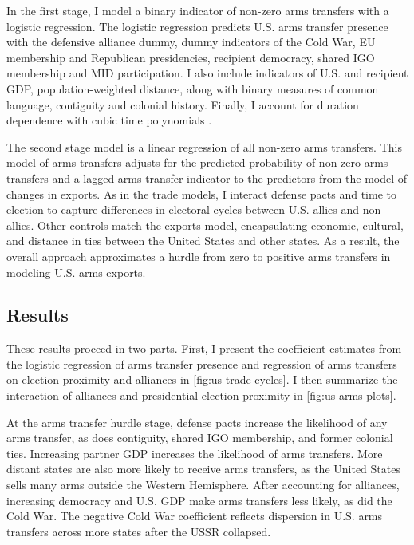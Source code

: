 \documentclass[12pt]{article}
\begin{document}
In the first stage, I model a binary indicator of non-zero arms transfers with a logistic regression. 
The logistic regression predicts U.S. arms transfer presence with the defensive alliance dummy, dummy indicators of the Cold War, EU membership and Republican presidencies, recipient democracy, shared IGO membership and MID participation. 
I also include indicators of U.S. and recipient GDP, population-weighted distance, along with binary measures of common language, contiguity and colonial history. 
Finally, I account for duration dependence with cubic time polynomials \citep{CarterSignorino2010}.


The second stage model is a linear regression of all non-zero arms transfers.
This model of arms transfers adjusts for the predicted probability of non-zero arms transfers and a lagged arms transfer indicator to the predictors from the model of changes in exports.
As in the trade models, I interact defense pacts and time to election to capture differences in electoral cycles between U.S. allies and non-allies. 
Other controls match the exports model, encapsulating economic, cultural, and distance in ties between the United States and other states. 
As a result, the overall approach approximates a hurdle from zero to positive arms transfers in modeling U.S. arms exports. 


\subsection{Results}


These results proceed in two parts.
First, I present the coefficient estimates from the logistic regression of arms transfer presence and regression of arms transfers on election proximity and alliances in \autoref{fig:us-trade-cycles}.
I then summarize the interaction of alliances and presidential election proximity in \autoref{fig:us-arms-plots}.


At the arms transfer hurdle stage, defense pacts increase the likelihood of any arms transfer, as does contiguity, shared IGO membership, and former colonial ties.
Increasing partner GDP increases the likelihood of arms transfers.
More distant states are also more likely to receive arms transfers, as the United States sells many arms outside the Western Hemisphere. 
After accounting for alliances, increasing democracy and U.S. GDP make arms transfers less likely, as did the Cold War. 
The negative Cold War coefficient reflects dispersion in U.S. arms transfers across more states after the USSR collapsed.
\end{document}

